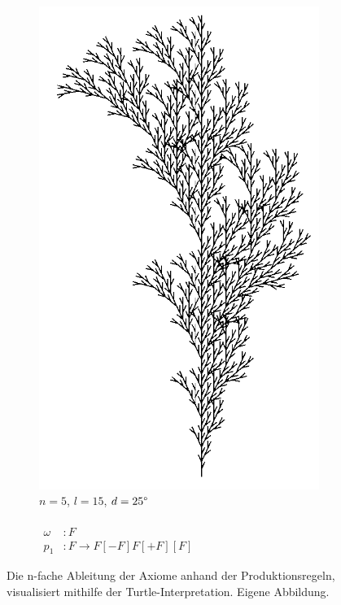 \begin{figure} [hbtp]
\begin{subfigure}[t]{.35\textwidth}
		\includegraphics[width=\linewidth]{images/Branching2_N5L15D25.png}
		\caption{$n=5$, $l=15$, $d=25\degree$\\ \\
			$\begin{array}{ll}
				\omega & : F \\
				p_1 & : F \rightarrow F[-F]F[+F][F]
			\end{array}
			\label{eq:ProdBranching2}$\\
			\cite[S.78]{PCGiG:16}
		}
		\label{fig:Branching2L15D25}
	\end{subfigure}

	\caption{Die n-fache Ableitung der Axiome anhand der Produktionsregeln, visualisiert mithilfe der Turtle-Interpretation. Eigene Abbildung.}
	\label{fig:BranchingLSystems}
\end{figure}

